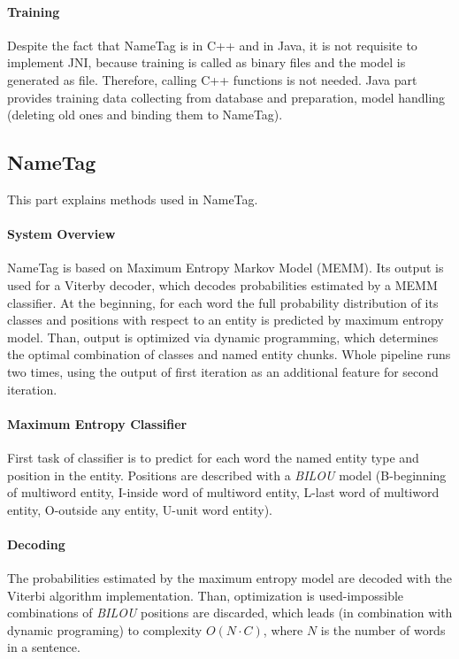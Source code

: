 \paragraph{Training}
Despite the fact that NameTag is in C++ and \textan{} in Java, it is not
requisite to implement JNI, because training is called as binary files and the
model is generated as file. Therefore, calling C++ functions is not needed. Java
part provides training data collecting from database and preparation, model
handling (deleting old ones and binding them to NameTag).

\subsection{NameTag}
This part explains methods used in NameTag. 

\paragraph{System Overview}
NameTag is based on Maximum Entropy Markov Model (MEMM). Its output is used for a Viterby decoder, which decodes probabilities estimated by a MEMM classifier.
At the beginning, for each word the full probability distribution of its classes and positions with respect to an entity is predicted by maximum entropy model. Than, output is optimized via dynamic programming, which determines the optimal combination of classes and named entity chunks.
Whole pipeline runs two times, using the output of first iteration as an additional feature for second iteration.

\paragraph{Maximum Entropy Classifier}
First task of classifier is to predict for each word the named entity type and position in the entity. Positions are described with a {\it BILOU} model (B-beginning of multiword entity, I-inside word of multiword entity, L-last word of multiword entity, O-outside any entity, U-unit word entity).

\paragraph{Decoding}
The probabilities estimated by the maximum entropy model are decoded with the Viterbi algorithm implementation. Than, optimization is used-impossible combinations of {\it BILOU} positions are discarded, which leads (in combination with dynamic programing) to complexity  \(O(N \cdot C)\), where \(N\) is the number of words in a sentence.

